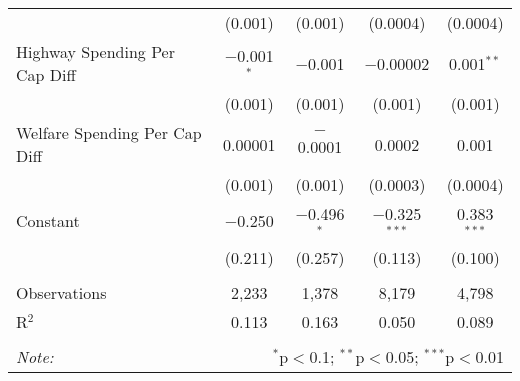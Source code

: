 \begin{table}[!htbp]
\begin{tabular}{@{\extracolsep{5pt}}lcccc}
  & (0.001) & (0.001) & (0.0004) & (0.0004) \\ 
  Highway Spending Per Cap Diff & $-$0.001$^{*}$ & $-$0.001 & $-$0.00002 & 0.001$^{**}$ \\ 
  & (0.001) & (0.001) & (0.001) & (0.001) \\ 
  Welfare Spending Per Cap Diff & 0.00001 & $-$0.0001 & 0.0002 & 0.001 \\ 
  & (0.001) & (0.001) & (0.0003) & (0.0004) \\ 
  Constant & $-$0.250 & $-$0.496$^{*}$ & $-$0.325$^{***}$ & 0.383$^{***}$ \\ 
  & (0.211) & (0.257) & (0.113) & (0.100) \\ 
 \hline \\[-1.8ex] 
Observations & 2,233 & 1,378 & 8,179 & 4,798 \\ 
R$^{2}$ & 0.113 & 0.163 & 0.050 & 0.089 \\ 
\hline 
\hline \\[-1.8ex] 
\textit{Note:}  & \multicolumn{4}{r}{$^{*}$p$<$0.1; $^{**}$p$<$0.05; $^{***}$p$<$0.01} \\ 
\end{tabular} 
\end{table} 
